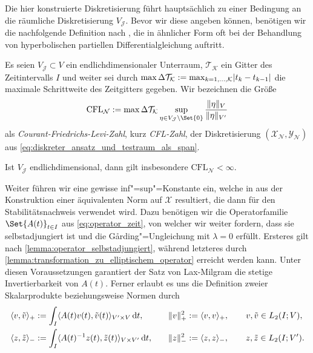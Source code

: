 \documentclass[../main.tex]{subfiles}
\begin{document}
Die hier konstruierte Diskretisierung führt hauptsächlich zu einer Bedingung an die räumliche Diskretisierung $V_{\mathcal J}$.
Bevor wir diese angeben können, benötigen wir die nachfolgende Definition nach \cite[62]{Andreev:2012ep}, die in ähnlicher Form oft bei der Behandlung von hyperbolischen partiellen Differentialgleichung auftritt.

\begin{Definition}\label{definiton:cfl_zahl}
    Es seien $V_{\mathcal J} \subset V$ ein endlichdimensionaler Unterraum, $\mathcal T_{\mathcal K}$ ein Gitter des Zeitintervalls $I$ und weiter sei durch $\max \Delta \mathcal T_{\mathcal K} := \max_{k = 1, \dots, \mathcal K} \lvert t_{k} - t_{k - 1}\rvert$ die maximale Schrittweite des Zeitgitters gegeben.
    Wir bezeichnen die Größe
    \begin{equation}
        \label{eq:cfl_zahl}
        \mathrm{CFL}_{\mathcal N} := \max \Delta \mathcal T_{\mathcal K} \sup_{\eta \in V_{\mathcal J} \setminus \Set{0} } \frac{\norm{\eta}_{V}}{\norm{\eta}_{V'}}
    \end{equation}
    als \emph{Courant-Friedrichs-Levi-Zahl}, kurz \emph{CFL-Zahl}, der Diskretisierung $(\mathcal X_{\mathcal N}, \mathcal Y_{\mathcal N})$ aus \cref{eq:diskreter_ansatz_und_testraum_als_span}.
\end{Definition}

\begin{Bemerkung}
    Ist $V_{\mathcal J}$ endlichdimensional, dann gilt insbesondere $\mathrm{CFL}_{\mathcal N} < \infty$.
\end{Bemerkung}

Weiter führen wir eine gewisse inf"=sup"=Konstante ein, welche in \cite[57]{Andreev:2012ep} aus der Konstruktion einer äquivalenten Norm auf $\mathcal X$ resultiert, die dann für den Stabilitätsnachweis \cite[Theorem 5.2.6]{Andreev:2012ep} verwendet wird.
Dazu benötigen wir die Operatorfamilie $\Set{A(t)}_{t \in I}$ aus \cref{eq:operator_zeit}, von welcher wir weiter fordern, dass sie selbstadjungiert ist und die G\aa{}rding"=Ungleichung mit $\lambda = 0$ erfüllt.
Ersteres gilt nach \cref{lemma:operator_selbstadjungiert}, während letzteres durch \cref{lemma:transformation_zu_elliptischem_operator} erreicht werden kann.
Unter diesen Voraussetzungen garantiert der Satz von Lax-Milgram \cite[Section 6.2.1]{evans2010partial} die stetige Invertierbarkeit von $A(t)$.
Ferner erlaubt es uns die Definition zweier Skalarprodukte beziehungsweise Normen durch
\begin{equation}
    \begin{aligned}
        \langle v,\tilde{v}\rangle_{+} &:= \int_{I} \langle A(t)v(t),\tilde{v}(t)\rangle_{V' \times V} \mathop{}\!\mathrm{d} t,
        \quad&
        \lVert v\rVert^{2}_{+} &:= \langle v,v\rangle_{+},
        \qquad
        v, \tilde{v} \in L_{2}(I; V), \\
        \langle z,\tilde{z}\rangle_{-} &:= \int_{I} \langle A(t)^{-1} z(t),\tilde z(t)\rangle_{V \times V'} \mathop{}\!\mathrm{d} t,
        \quad&
        \lVert z\rVert_{-}^{2} &:= \langle z,z\rangle_{-},
        \qquad z, \tilde z \in L_{2}(I; V').
    \end{aligned}
\end{equation}
\end{document}
